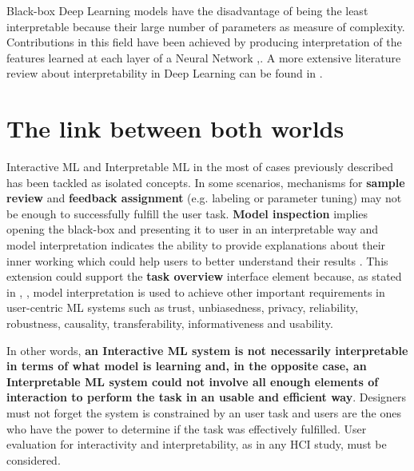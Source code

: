 Black-box Deep Learning models have the disadvantage of being the least interpretable because their large number of parameters as measure of complexity. Contributions in this field have been achieved by producing interpretation of the features learned at each layer of a Neural Network \cite{Yosinski2015a},\cite{Olah2018}. A more extensive literature review about interpretability in Deep Learning can be found in \cite{Zhang2018}.

\section{The link between both worlds} %
\label{section2.3}

Interactive ML and Interpretable ML in the most of cases previously described has been tackled as isolated concepts. In some scenarios, mechanisms for \textbf{sample review} and \textbf{feedback assignment} (e.g. labeling or parameter tuning) may not be enough to successfully fulfill the user task. \textbf{Model inspection} implies opening the black-box and presenting it to user in an interpretable way and model interpretation indicates the ability to provide explanations about their inner working which could help users to better understand their results \cite{Doshi-Velez2017c}. This extension could support the \textbf{task overview} interface element because, as stated in \cite{Doshi-Velez2017c}, \cite{Lipton2017}, model interpretation is used to achieve other important requirements in user-centric ML systems such as trust, unbiasedness, privacy, reliability, robustness, causality, transferability, informativeness and usability.

In other words, \textbf{an Interactive ML system is not necessarily interpretable in terms of what model is learning and, in the opposite case, an Interpretable ML system could not involve all enough elements of interaction to perform the task in an usable and efficient way}. Designers must not forget the system is constrained by an user task and users are the ones who have the power to determine if the task was effectively fulfilled. User evaluation for interactivity and interpretability, as in any HCI study, must be considered.
